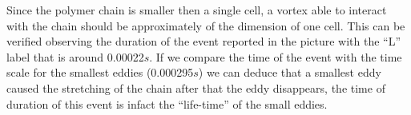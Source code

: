 Since the polymer chain is smaller then a single cell, a vortex able to interact with the chain should be approximately of the dimension of one cell. This can be verified observing the duration of the event reported in the picture with the ``L'' label that is around 0.00022$s$. 
If we compare the time of the event with the time scale for the smallest eddies (0.000295$s$) we can deduce that a smallest eddy caused the stretching of the chain after that the eddy disappears, the time of duration of this event is infact the ``life-time'' of the small eddies.








%
